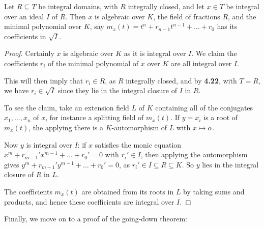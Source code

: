 \documentclass[10pt,a4paper]{article}
\begin{document}
\begin{lemma}
  Let $R \subseteq T$ be integral domains, with $R$ integrally closed, and let $x \in T$ be integral over an ideal $I$ of $R$. Then $x$ is algebraic over $K$, the field of fractions $R$, and the minimal polynomial over $K$, say $m_x(t) = t^n + r_{n-1}t^{n-1} + \ldots+ r_0$ has its coefficients in $\sqrt{I}$.
\end{lemma}
\begin{proof}
  Certainly $x$ is algebraic over $K$ as it is integral over $I$. We claim the coefficients $r_i$ of the minimal polynomial of $x$ over $K$ are all integral over $I$.

  This will then imply that $r_i \in R$, as $R$ integrally closed, and by \textbf{4.22}, with $T=R$, we have $r_i \in \sqrt{I}$ since they lie in the integral closure of $I$ in $R$.

  To see the claim, take an extension field $L$ of $K$ containing all of the conjugates $x_1, \ldots, x_n$ of $x$, for instance a splitting field of $m_x(t)$. If $y = x_i$ is a root of $m_x(t)$, the applying there is a $K$-automorphism of $L$ with $x \mapsto \alpha$.

  Now $y$ is integral over $I$: if $x$ satisfies the monic equation $x^m + r_{m-1}'x^{m-1} + \ldots +r_0' = 0$ with $r_i' \in I$, then applying the automorphism gives $y^m + r_{m-1}'y^{m-1} + \ldots +r_0' = 0$, as $r_i'\in I \subseteq R \subseteq K$. So $y$ lies in the integral closure of $R$ in $L$.

  The coefficients $m_x(t)$ are obtained from its roots in $L$ by taking sums and products, and hence these coefficients are integral over $I$.
\end{proof}
Finally, we move on to a proof of the going-down theorem:
\end{document}
